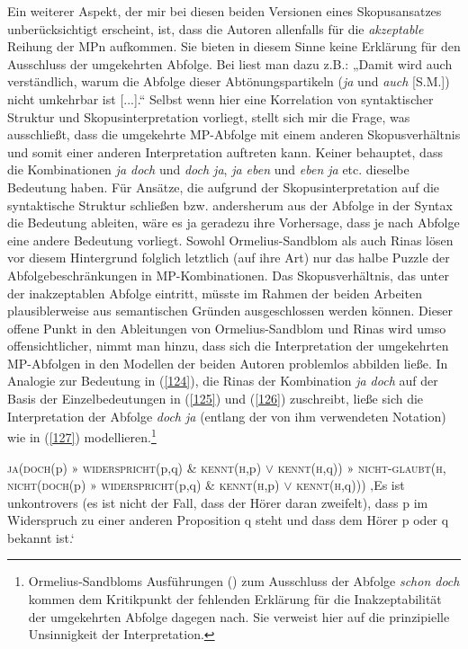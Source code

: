 \noindent
Ein weiterer Aspekt, der mir bei diesen beiden Versionen eines Skopusansatzes unberücksichtigt erscheint, ist, dass die Autoren allenfalls für die \emph{akzeptable} Reihung der MPn aufkommen. Sie bieten in diesem Sinne keine Erklärung für den Ausschluss der umgekehrten Abfolge. Bei \citet[425 bzw. 434]{Rinas2007} liest man dazu z.B.: „Damit wird auch verständlich, warum die Abfolge dieser Abtönungspartikeln (\textit{ja} und \textit{auch} [S.M.]) nicht umkehrbar ist [...].“ Selbst wenn hier eine Korrelation von syntaktischer Struktur und Skopusinterpretation vorliegt, stellt sich mir die Frage, was ausschließt, dass die umgekehrte MP-Abfolge mit einem anderen Skopusverhältnis und somit einer anderen Interpretation auftreten kann. Keiner behauptet, dass die Kombinationen \textit{ja doch} und \textit{doch ja}, \textit{ja eben} und \textit{eben ja} etc. dieselbe Bedeutung haben. Für Ansätze, die aufgrund der Skopusinterpretation auf die syntaktische Struktur schließen bzw. andersherum aus der Abfolge in der Syntax die Bedeutung ableiten, wäre es ja geradezu ihre Vorhersage, dass je nach Abfolge eine andere Bedeutung vorliegt. Sowohl Ormelius-Sandblom als auch Rinas lösen vor diesem Hintergrund folglich letztlich (auf ihre Art) nur das halbe Puzzle der Abfolgebeschränkungen in MP-Kom\-bi\-na\-ti\-on\-en. Das Skopusverhältnis,  das unter der inakzeptablen Abfolge eintritt, müsste im Rahmen der beiden Arbeiten plausiblerweise aus semantischen Gründen ausgeschlossen werden können. Dieser offene Punkt in den Ableitungen von Orme\-lius-Sandblom und Rinas wird umso offensichtlicher, nimmt man hinzu, dass sich die Interpretation der umgekehrten MP-Abfolgen in den Modellen der beiden Autoren problemlos abbilden ließe. In Analogie zur Bedeutung in (\ref{124}), die Rinas der Kombination \textit{ja doch} auf der Basis der Einzelbedeutungen in (\ref{125}) und (\ref{126}) zuschreibt, ließe sich die Interpretation der Abfolge \textit{doch ja} (entlang der von ihm verwendeten Notation) wie in (\ref{127}) modellieren.\footnote{Ormelius-Sandbloms Ausführungen (\citeyear[93--94]{Ormelius-Sandblom1997}) zum Ausschluss der Abfolge \textit{schon doch} kommen dem Kritikpunkt der fehlenden Erklärung für die Inakzeptabilität der umgekehrten Abfolge dagegen nach. Sie verweist hier auf die prinzipielle Unsinnigkeit der Interpretation.}

\begin{exe}{\sloppy
	\ex\label{124} 
		\begin{xlist}	
			\ex\label{124a} \textsc{ja}(\textsc{doch}(p) » \textsc{widerspricht}(p,q) \& \textsc{kennt}(\textsc{h},p) $\lor$ \textsc{kennt}(\textsc{h},q))
				» \textsc{nicht-glaubt}(\textsc{h}, \textsc{nicht}(\textsc{doch}(p) » \textsc{widerspricht}(p,q) \& \textsc{kennt}(\textsc{h},p) $\lor$ \textsc{kennt}(\textsc{h},q)))
			\ex\label{124b} ‚Es ist unkontrovers (es ist nicht der Fall, dass der Hörer daran zweifelt), dass p im Widerspruch zu einer anderen Proposition q steht und dass dem Hörer p oder q bekannt ist.‘
			\hfill\hbox{\citet[431]{Rinas2007}}
		\end{xlist}}
\end{exe}

